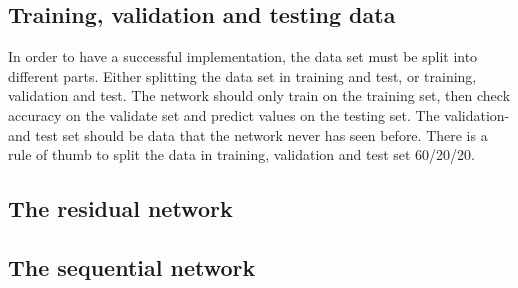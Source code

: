 \documentclass[USenglish]{ifimaster}  %
\begin{document}
\subsection{Training, validation and testing data}

In order to have a successful implementation, the data set must be split into different parts. Either splitting the data set in training and test, or training, validation and test. The network should only train on the training set, then check accuracy on the validate set and predict values on the testing set. The validation- and test set should be data that the network never has seen before. There is a rule of thumb to split the data in training, validation and test set 60/20/20.  
\subsection{The residual network}
\subsection{The sequential network}
\end{document}
